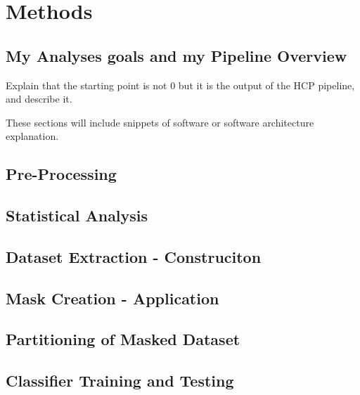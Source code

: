 \pagebreak
\chapter{Methods}
\label{sec:methods}

\section{My Analyses goals and my Pipeline Overview}

Explain that the starting point is not 0 but it is the output of the HCP pipeline, and describe it.

These sections will include snippets of software or software architecture explanation.

\section{Pre-Processing}

\section{Statistical Analysis}

\section{Dataset Extraction - Construciton}

\section{Mask Creation - Application}

\section{Partitioning of Masked Dataset}

\section{Classifier Training and Testing}